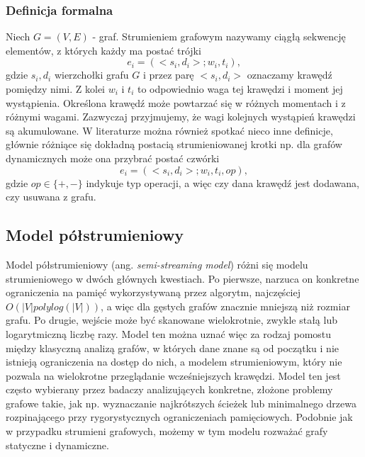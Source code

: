         \subsubsection*{Definicja formalna}
            Niech $G = (V,E)$ - graf. Strumieniem grafowym nazywamy ciągłą sekwencję elementów, z których każdy ma postać trójki 
            \[
                e_i = (<s_i, d_i>; w_i, t_i),
            \]
            gdzie $s_i, d_i$ wierzchołki grafu $G$ i przez parę $<s_i, d_i>$ oznaczamy krawędź pomiędzy nimi. Z kolei $w_i$ i $t_i$ to odpowiednio waga tej krawędzi i moment jej wystąpienia. Określona krawędź może powtarzać się w różnych momentach i z różnymi wagami. Zazwyczaj przyjmujemy, że wagi kolejnych wystąpień krawędzi są akumulowane. W literaturze można również spotkać nieco inne definicje, głównie różniące się dokładną postacią strumieniowanej krotki np. dla grafów dynamicznych może ona przybrać postać czwórki 
            \[
                e_i = (<s_i, d_i>; w_i, t_i, op), 
            \]
            gdzie $op \in \{+, -\}$ indykuje typ operacji, a więc czy dana krawędź jest dodawana, czy usuwana z grafu\cite{Pacaci_Bonifati_Özsu_2020}.  
        
    \subsection{Model półstrumieniowy}
        Model półstrumieniowy\cite{Feigenbaum_Kannan_McGregor_Suri_Zhang_2005} (ang. \textit{semi-streaming model}) różni się modelu strumieniowego w dwóch głównych kwestiach. Po pierwsze, narzuca on konkretne ograniczenia na pamięć wykorzystywaną przez algorytm, najczęściej $O(|V| polylog(|V|))$, a więc dla gęstych grafów znacznie mniejszą niż rozmiar grafu. Po drugie, wejście może być skanowane wielokrotnie, zwykle stałą lub logarytmiczną liczbę razy. Model ten można uznać więc za rodzaj pomostu między klasyczną analizą grafów, w których dane znane są od początku i nie istnieją ograniczenia na dostęp do nich, a modelem strumieniowym, który nie pozwala na wielokrotne przeglądanie wcześniejszych krawędzi. Model ten jest często wybierany przez badaczy analizujących konkretne, złożone problemy grafowe takie, jak np.  wyznaczanie najkrótszych ścieżek \cite{Elkin_Trehan_2022} lub minimalnego drzewa rozpinającego \cite{Ahn_Guha_McGregor_2012} przy rygorystycznych ograniczeniach pamięciowych. Podobnie jak w przypadku strumieni grafowych, możemy w tym modelu rozważać grafy statyczne i dynamiczne.


